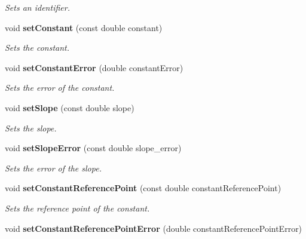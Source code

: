 \begin{DoxyCompactItemize}
\begin{DoxyCompactList}\small\item\em Sets an identifier. \item\end{DoxyCompactList}\item 
void {\bf setConstant} (const double constant)\label{classCALICE_1_1LinearFitCompound_a144ad1196e206d632f000939097d80aa}

\begin{DoxyCompactList}\small\item\em Sets the constant. \item\end{DoxyCompactList}\item 
void {\bf setConstantError} (double constantError)\label{classCALICE_1_1LinearFitCompound_aa990f347871e140731ae76b27277efc7}

\begin{DoxyCompactList}\small\item\em Sets the error of the constant. \item\end{DoxyCompactList}\item 
void {\bf setSlope} (const double slope)\label{classCALICE_1_1LinearFitCompound_afed1ff8b17afcaee84727a41ace77349}

\begin{DoxyCompactList}\small\item\em Sets the slope. \item\end{DoxyCompactList}\item 
void {\bf setSlopeError} (const double slope\_\-error)\label{classCALICE_1_1LinearFitCompound_af8761b938e369b0daaa1ec258db93a7e}

\begin{DoxyCompactList}\small\item\em Sets the error of the slope. \item\end{DoxyCompactList}\item 
void {\bf setConstantReferencePoint} (const double constantReferencePoint)\label{classCALICE_1_1LinearFitCompound_a9f694715ade079c8e0e8af5496707e37}

\begin{DoxyCompactList}\small\item\em Sets the reference point of the constant. \item\end{DoxyCompactList}\item 
void {\bf setConstantReferencePointError} (double constantReferencePointError)\label{classCALICE_1_1LinearFitCompound_a0e2c5570c83bbb2e3f3a0e9124258d4f}


\end{DoxyCompactItemize}
